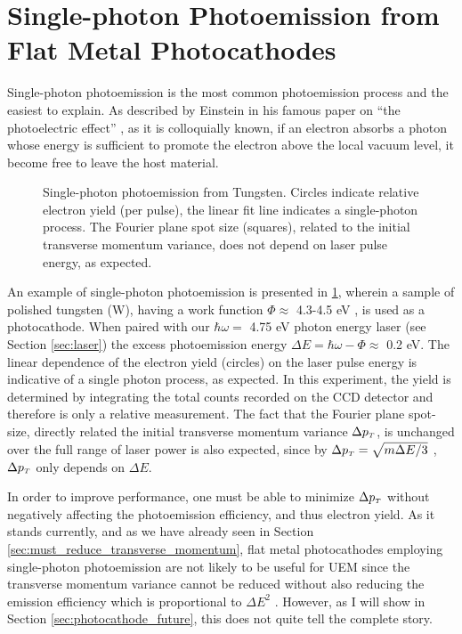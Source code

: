 \section{Single-photon Photoemission from Flat Metal Photocathodes}

Single-photon photoemission is the most common photoemission process and the easiest to explain.
As described by Einstein in his famous paper on ``the photoelectric effect'' \cite{einstein_uber_1905}, as it is colloquially known, if an electron absorbs a photon whose energy is sufficient to promote the electron above the local vacuum level, it become free to leave the host material.

\begin{figure}
  \centering
  
  \caption[Single-photon photoemission from Tungsten]{
    Single-photon photoemission from Tungsten.
    Circles indicate relative electron yield (per pulse), the linear fit line indicates a single-photon process.
    The Fourier plane spot size (squares), related to the initial transverse momentum variance, does not depend on laser pulse energy, as expected.
  }
  \label{fig:single_photon_tungsten}
\end{figure}

An example of single-photon photoemission is presented in \ref{fig:single_photon_tungsten}, wherein a sample of polished tungsten (W), having a work function $\Phi \approx $ 4.3-4.5 eV \cite{yen_thermally_1980}, is used as a photocathode.
When paired with our $\hbar \omega = $ 4.75 eV photon energy laser (see Section \ref{sec:laser}) the excess photoemission energy $\Delta E = \hbar \omega - \Phi \approx $ 0.2 eV.
The linear dependence of the electron yield (circles) on the laser pulse energy is indicative of a single photon process, as expected.
In this experiment, the yield is determined by integrating the total counts recorded on the CCD detector and therefore is only a relative measurement.
The fact that the Fourier plane spot-size, directly related the initial transverse momentum variance $\Delta p_{{\scriptscriptstyle T}}$, is unchanged over the full range of laser power is also expected, since by $\Delta p_{{\scriptscriptstyle T}} = \sqrt{ m \Delta E / 3 } $ \cite{dowell_quantum_2009}, $\Delta p_{{\scriptscriptstyle T}}$ only depends on $\Delta E$.

In order to improve performance, one must be able to minimize $\Delta p_{{\scriptscriptstyle T}}$ without negatively affecting the photoemission efficiency, and thus electron yield.
As it stands currently, and as we have already seen in Section \ref{sec:must_reduce_transverse_momentum}, flat metal photocathodes employing single-photon photoemission are not likely to be useful for UEM since the transverse momentum variance cannot be reduced without also reducing the emission efficiency which is proportional to $\Delta E^2$ \cite{shalaev_electron_1994}.
However, as I will show in Section \ref{sec:photocathode_future}, this does not quite tell the complete story.

